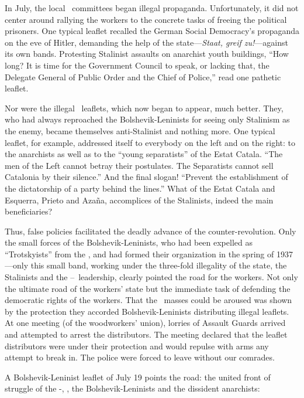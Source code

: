 In July, the local \FAI\ committees began illegal propaganda. Unfortunately, it did not center around rallying the workers to the concrete tasks of freeing the political prisoners. One typical leaflet recalled the German Social Democracy’s propaganda on the eve of Hitler, demanding the help of the state---\emph{Staat, greif zu!}---against its own bands. Protesting Stalinist assaults on anarchist youth buildings, ``How long? It is time for the Government Council to speak, or lacking that, the Delegate General of Public Order and the Chief of Police,'' read one pathetic leaflet.

Nor were the illegal \POUM\ leaflets, which now began to appear, much better. They, who had always reproached the Bolshevik-Len\-in\-ists for seeing only Stalinism as the enemy, became themselves anti-Stalinist and nothing more. One typical leaflet, for example, addressed itself to everybody on the left and on the right: to the anarchists as well as to the ``young separatists'' of the Estat Catala. ``The men of the Left cannot betray their postulates. The Separatists cannot sell Catalonia by their silence.'' And the final slogan! ``Prevent the establishment of the dictatorship of a party behind the lines.'' What of the Estat Catala and Esquerra, Prieto and Azaña, accomplices of the Stalinists, indeed the main beneficiaries?

Thus, false policies facilitated the deadly advance of the counter-revolution. Only the small forces of the Bolshevik-Leninists, who had been expelled as ``Trotskyists'' from the \POUM, and had formed their organization in the spring of 1937---only this small band, working under the three-fold illegality of the state, the Stalinists and the \CNT--\POUM\ leadership, clearly pointed the road for the workers. Not only the ultimate road of the workers’ state but the immediate task of defending the democratic rights of the workers. That the \CNT\ masses could be aroused was shown by the protection they accorded Bolshevik-Leninists distributing illegal leaflets. At one meeting (of the woodworkers’ union), lorries of Assault Guards arrived and attempted to arrest the distributors. The meeting declared that the leaflet distributors were under their protection and would repulse with arms any attempt to break in. The police were forced to leave without our comrades.

A Bolshevik-Leninist leaflet of July 19 points the road: the united front of struggle of the \CNT-\FAI, \POUM, the Bolshevik-Leninists and the dissident anarchists:

